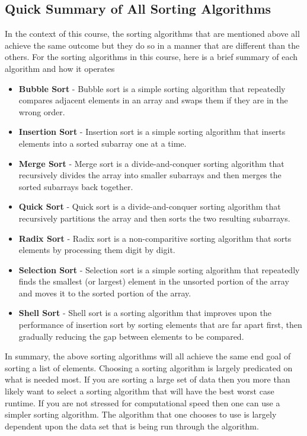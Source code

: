 \documentclass[a4paper,9pt]{article}
\begin{document}
\subsection*{Quick Summary of All Sorting Algorithms}

In the context of this course, the sorting algorithms that are mentioned above all achieve the same outcome but they do so in a manner that are different than the others. For the sorting algorithms in this course, here is a brief summary of each algorithm and how it operates

\begin{itemize}
    \item \textbf{Bubble Sort} - Bubble sort is a simple sorting algorithm that repeatedly compares adjacent elements in an array and swaps them if they are in the wrong order.
    \item \textbf{Insertion Sort} - Insertion sort is a simple sorting algorithm that inserts elements into a sorted subarray one at a time.
    \item \textbf{Merge Sort} - Merge sort is a divide-and-conquer sorting algorithm that recursively divides the array into smaller subarrays and then merges the sorted subarrays back together.
    \item \textbf{Quick Sort} - Quick sort is a divide-and-conquer sorting algorithm that recursively partitions the array and then sorts the two resulting subarrays.
    \item \textbf{Radix Sort} - Radix sort is a non-comparitive sorting algorithm that sorts elements by processing them digit by digit.
    \item \textbf{Selection Sort} - Selection sort is a simple sorting algorithm that repeatedly finds the smallest (or largest) element in the unsorted portion of the array and moves it to the sorted portion of the array.
    \item \textbf{Shell Sort} - Shell sort is a sorting algorithm that improves upon the performance of insertion sort by sorting elements that are far apart first, then gradually reducing the gap between elements to be compared.
\end{itemize}

\noindent In summary, the above sorting algorithms will all achieve the same end goal of sorting a list of elements. Choosing a sorting algorithm is largely predicated on what is needed most. If you are sorting a large set of data then you more than likely want to select a sorting algorithm that will have the best worst case runtime. If you are not stressed for computational speed then one can use a simpler sorting algorithm. The algorithm that one chooses to use is largely dependent upon the data set that is being run through the algorithm.
\end{document}

